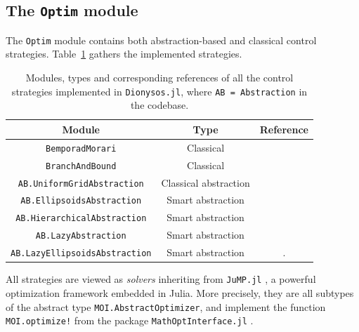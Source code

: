\documentclass{juliacon}
\begin{document}
\subsection{The \texttt{Optim} module}

The \texttt{Optim} module contains both abstraction-based and classical control strategies. Table~\ref{tab:solvers} gathers the implemented strategies.
\begin{table}[ht!]
    \centering
    \begin{tabular}{ccc}
        Module & Type & Reference \\ \hline 
        \texttt{BemporadMorari} & Classical & \cite{Bemporad1999} \\
        \texttt{BranchAndBound} & Classical & \cite{legat2021abstraction} \\
        \texttt{AB.UniformGridAbstraction} & Classical abstraction & \cite{reissig2016feedback} \\
        \texttt{AB.EllipsoidsAbstraction} & Smart abstraction & \cite{egidio2022state} \\
        \texttt{AB.HierarchicalAbstraction} & Smart abstraction & \cite{calbert2021alternating} \\
        \texttt{AB.LazyAbstraction} & Smart abstraction & \cite{calbert2021alternating} \\
        \texttt{AB.LazyEllipsoidsAbstraction} & Smart abstraction & \cite{calbert2024smart}.
    \end{tabular}
    \caption{Modules, types and corresponding references of all the control strategies implemented in \texttt{Dionysos.jl}, where \texttt{AB = Abstraction} in the codebase.}
    \label{tab:solvers}
\end{table}
All strategies are viewed as \emph{solvers} inheriting from \texttt{JuMP.jl} \cite{Lubin2023}, a powerful optimization framework embedded in Julia. More precisely, they are all subtypes of the abstract type \texttt{MOI.AbstractOptimizer}, and implement the function \texttt{MOI.optimize!} from the package \texttt{MathOptInterface.jl} \cite{legat2022mathoptinterface}. 

\vskip 6pt
\end{document}
